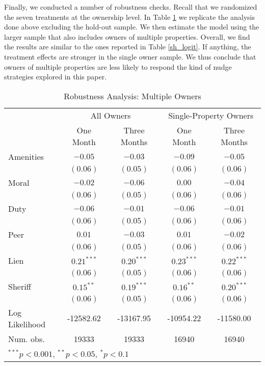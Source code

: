 \documentclass[12pt]{article}
\begin{document}
Finally, we conducted a number of robustness checks. Recall that we
randomized the seven treatments at the ownership level. In Table
\ref{sh_logit_rob} we replicate the analysis done above excluding the
hold-out sample. We then estimate the model using the larger sample
that also includes owners of multiple properties. Overall, we find the
results are similar to the ones reported in Table \ref{sh_logit}. If
anything, the treatment effects are stronger in the single owner
sample. We thus conclude that owners of multiple properties are less
likely to respond the kind of nudge strategies explored in this paper.

\begin{table}[htbp]
\caption{Robustness Analysis: Multiple Owners}\label{sh_logit_rob}
\begin{center}
\begin{tabular}{l c c c c }
\hline
 & \multicolumn{2}{c}{All Owners} & \multicolumn{2}{c}{Single-Property Owners} \\
               & One Month & Three Months & One Month & Three Months \\
\hline
Amenities      & $-0.05$      & $-0.03$      & $-0.09$      & $-0.05$      \\
               & $(0.06)$     & $(0.05)$     & $(0.06)$     & $(0.06)$     \\
Moral          & $-0.02$      & $-0.06$      & $0.00$       & $-0.04$      \\
               & $(0.06)$     & $(0.05)$     & $(0.06)$     & $(0.06)$     \\
Duty           & $-0.06$      & $-0.01$      & $-0.06$      & $-0.01$      \\
               & $(0.06)$     & $(0.05)$     & $(0.06)$     & $(0.06)$     \\
Peer           & $0.01$       & $-0.03$      & $0.01$       & $-0.02$      \\
               & $(0.06)$     & $(0.05)$     & $(0.06)$     & $(0.06)$     \\
Lien           & $0.21^{***}$ & $0.20^{***}$ & $0.23^{***}$ & $0.22^{***}$ \\
               & $(0.06)$     & $(0.05)$     & $(0.06)$     & $(0.06)$     \\
Sheriff        & $0.15^{**}$  & $0.19^{***}$ & $0.16^{**}$  & $0.20^{***}$ \\
               & $(0.06)$     & $(0.05)$     & $(0.06)$     & $(0.06)$     \\
\hline
Log Likelihood & -12582.62    & -13167.95    & -10954.22    & -11580.00    \\
Num. obs.      & 19333        & 19333        & 16940        & 16940        \\
\hline
\multicolumn{5}{l}{\scriptsize{$^{***}p<0.001$, $^{**}p<0.05$, $^*p<0.1$}}
\end{tabular}
\end{center}
\end{table}
\end{document}
